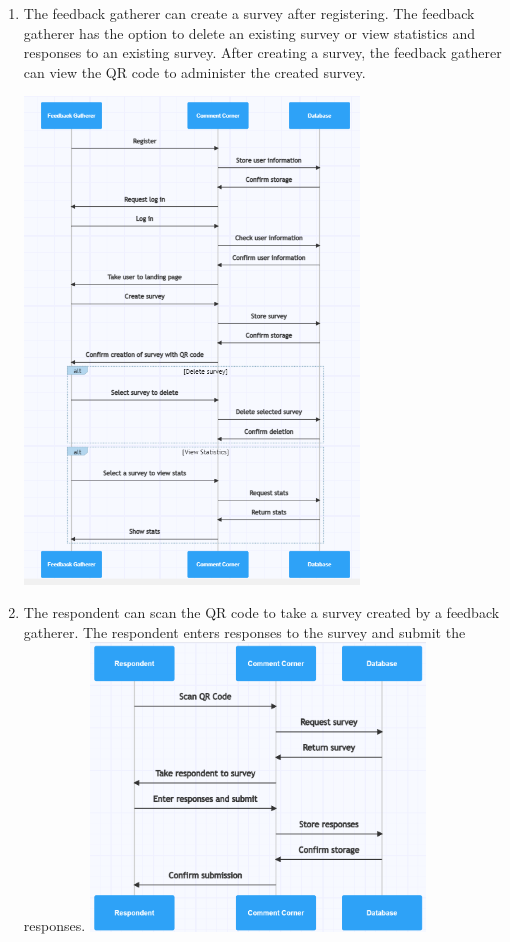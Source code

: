 \documentclass[letterpaper, 12 pt, conference]{ieeeconf}
\begin{document}
\begin{enumerate}
    \item The feedback gatherer can create a survey after registering. The feedback gatherer has the option to delete an existing survey or view statistics and responses to an existing survey. After creating a survey, the feedback gatherer can view the QR code to administer the created survey.
    \hfill \break

    \includegraphics[width=0.70\textwidth]{feedbackGatherer.png}
\newpage
    \item The respondent can scan the QR code to take a survey created by a feedback gatherer. The respondent enters responses to the survey and submit the responses.
    \linebreak
    \hfill \break
    \includegraphics[width=0.70\textwidth]{respondent.png}
    

\end{enumerate}
\hfill \break
\end{document}
